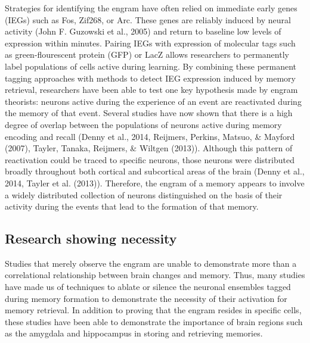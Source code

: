 \documentclass[12pt,a4paper,]{report}
\begin{document}
Strategies for identifying the engram have often relied on immediate
early genes (IEGs) such as Fos, Zif268, or Arc. These genes are reliably
induced by neural activity (John F. Guzowski et al., 2005) and return to
baseline low levels of expression within minutes. Pairing IEGs with
expression of molecular tags such as green-flourescent protein (GFP) or
LacZ allows researchers to permanently label populations of cells active
during learning. By combining these permanent tagging approaches with
methods to detect IEG expression induced by memory retrieval,
researchers have been able to test one key hypothesis made by engram
theorists: neurons active during the experience of an event are
reactivated during the memory of that event. Several studies have now
shown that there is a high degree of overlap between the populations of
neurons active during memory encoding and recall (Denny et al., 2014,
Reijmers, Perkins, Matsuo, \& Mayford (2007), Tayler, Tanaka, Reijmers,
\& Wiltgen (2013)). Although this pattern of reactivation could be
traced to specific neurons, those neurons were distributed broadly
throughout both cortical and subcortical areas of the brain (Denny et
al., 2014, Tayler et al. (2013)). Therefore, the engram of a memory
appears to involve a widely distributed collection of neurons
distinguished on the basis of their activity during the events that lead
to the formation of that memory.

\subsection{Research showing
necessity}\label{research-showing-necessity}

Studies that merely observe the engram are unable to demonstrate more
than a correlational relationship between brain changes and memory.
Thus, many studies have made us of techniques to ablate or silence the
neuronal ensembles tagged during memory formation to demonstrate the
necessity of their activation for memory retrieval. In addition to
proving that the engram resides in specific cells, these studies have
been able to demonstrate the importance of brain regions such as the
amygdala and hippocampus in storing and retrieving memories.
\end{document}

